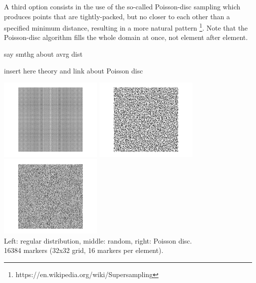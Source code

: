 A third option consists in the use of the so-called Poisson-disc sampling which 
produces points that are tightly-packed, but no closer to each other than 
a specified minimum distance, resulting in a more natural pattern 
\footnote{https://en.wikipedia.org/wiki/Supersampling}. Note that 
the Poisson-disc algorithm fills the whole domain at once, not element after element.

{\color{red} say smthg about avrg dist}  

{\color{red} insert here theory and link about Poisson disc }

\begin{center}
\includegraphics[width=5cm]{python_codes/fieldstone_13/images/markers_reg} 
\includegraphics[width=5cm]{python_codes/fieldstone_13/images/markers_rand} 
\includegraphics[width=5cm]{python_codes/fieldstone_13/images/markers_pd} \\
{\small Left: regular distribution, middle: random, right: Poisson disc.\\
 16384 markers (32x32 grid, 16 markers per element).}
\end{center}



